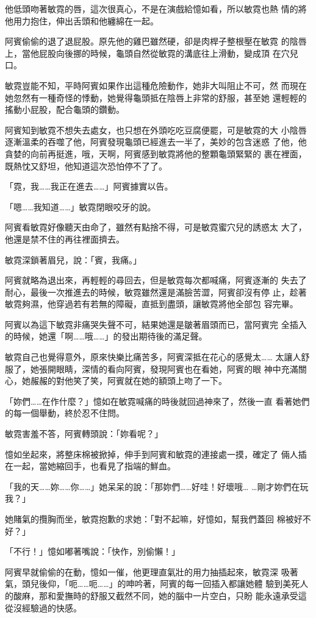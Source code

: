 他低頭吻著敏霓的唇，這次很真心，不是在演戲給憶如看，所以敏霓也熱
情的將他用力抱住，伸出舌頭和他纏綿在一起。

阿賓偷偷的退了退屁股。原先他的雞巴雖然硬，卻是肉桿子整根壓在敏霓
的陰唇上，當他屁股向後挪的時候，龜頭自然從敏霓的溝底往上滑動，變成頂
在穴兒口。

敏霓豈能不知，平時阿賓如果作出這種危險動作，她非大叫阻止不可，然
而現在她忽然有一種奇怪的悸動，她覺得龜頭抵在陰唇上非常的舒服，甚至她
還輕輕的搖動小屁股，配合龜頭的鑽動。

阿賓知到敏霓不想失去處女，也只想在外頭吃吃豆腐便罷，可是敏霓的大
小陰唇逐漸溫柔的吞噬了他，阿賓發現龜頭已經進去一半了，美妙的包含迷惑
了他，他貪婪的向前再挺進，哦，天啊，阿賓感到敏霓將他的整顆龜頭緊緊的
裹在裡面，既熱忱又舒坦，他知道這次恐怕停不了了。

「霓，我……我正在進去……」阿賓據實以告。

「嗯……我知道……」敏霓閉眼咬牙的說。

阿賓看敏霓好像聽天由命了，雖然有點捨不得，可是敏霓蜜穴兒的誘惑太
大了，他還是禁不住的再往裡面擠去。

敏霓深鎖著眉兒，說：「賓，我痛。」

阿賓就略為退出來，再輕輕的尋回去，但是敏霓每次都喊痛，阿賓逐漸的
失去了耐心，最後一次推進去的時候，敏霓雖然還是滿臉苦澀，阿賓卻沒有停
止，趁著敏霓夠濕，他穿過若有若無的障礙，直抵到盡頭，讓敏霓將他全部包
容完畢。

阿賓以為這下敏霓非痛哭失聲不可，結果她還是皺著眉頭而已，當阿賓完
全插入的時候，她還「啊……哦……」的發出期待後的滿足聲。

敏霓自己也覺得意外，原來快樂比痛苦多，阿賓深抵在花心的感覺太……
太讓人舒服了，她張開眼睛，深情的看向阿賓，發現阿賓也在看她，阿賓的眼
神中充滿關心，她赧赧的對他笑了笑，阿賓就在她的額頭上吻了一下。

「妳們……在作什麼？」憶如在敏霓喊痛的時後就回過神來了，然後一直
看著她們的每一個舉動，終於忍不住問。

敏霓害羞不答，阿賓轉頭說：「妳看呢？」

憶如坐起來，將整床棉被掀掉，伸手到阿賓和敏霓的連接處一摸，確定了
倆人插在一起，當她縮回手，也看見了指端的鮮血。

「我的天……妳……你……」她呆呆的說：「那妳們……好哇！好壞哦…
…剛才妳們在玩我？」

她賭氣的攬胸而坐，敏霓抱歉的求她：「對不起嘛，好憶如，幫我們蓋回
棉被好不好？」

「不行！」憶如嘟著嘴說：「快作，別偷懶！」

阿賓早就偷偷的在動，憶如一催，他更理直氣壯的用力抽插起來，敏霓深
吸著氣，頭兒後仰，「呃……呃……」的呻吟著，阿賓的每一回插入都讓她體
驗到美死人的酸麻，那和愛撫時的舒服又截然不同，她的腦中一片空白，只盼
能永遠承受這從沒經驗過的快感。

